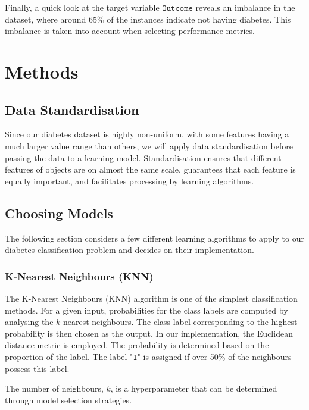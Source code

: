 \documentclass[12pt]{article}
\begin{document}
\indent Finally, a quick look at the target variable $\mathtt{Outcome}$ reveals an imbalance in the dataset, where around 65\% of the instances indicate not having diabetes. This imbalance is 
taken into account when selecting performance metrics.



\section{Methods}

\subsection{Data Standardisation}

\indent Since our diabetes dataset is highly non-uniform, with some features having a much larger value range than others, we will apply data standardisation before passing the data to a learning model. Standardisation ensures that different features of objects are on almost the same scale, guarantees that each feature is equally important, and facilitates processing by learning algorithms.


\subsection{Choosing Models}

The following section considers a few different learning algorithms to apply to our diabetes classification problem and decides on their implementation.



\subsubsection{K-Nearest Neighbours (KNN)\cite{BenningPerra2023}}



The K-Nearest Neighbours (KNN) algorithm is one of the simplest classification methods. 
For a given input, probabilities for the class labels are computed by analysing the \( k \) nearest neighbours.
The class label corresponding to the highest probability is then chosen as the output.
In our implementation, the Euclidean distance metric is employed.
The probability is determined based on the proportion of the label. 
The label "$\mathtt{1}$" is assigned if over 50\% of the neighbours possess this label.

The number of neighbours, \( k \), is a hyperparameter that can be determined through model selection strategies. 
\end{document}
